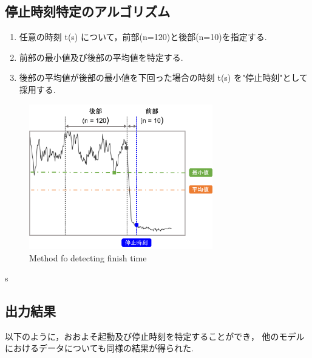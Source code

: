 \documentclass[twocolumn,a4j]{jsarticle}
\begin{document}
\subsection{停止時刻特定のアルゴリズム}
\begin{enumerate}[(1)]
    \item 任意の時刻 t(s) について，前部(n=120)と後部(n=10)を指定する.
    \item 前部の最小値及び後部の平均値を特定する.
    \item 後部の平均値が後部の最小値を下回った場合の時刻 t(s) を"停止時刻"として採用する.
\end{enumerate}
\begin{figure}[htbp]
    \footnotesize
    \begin{center}
        \includegraphics[width=80mm]{images/finish.png}
        \caption{Method fo detecting finish time}
    \end{center}
\end{figure}
s\subsection{出力結果}
以下のように，おおよそ起動及び停止時刻を特定することができ，
他のモデルにおけるデータについても同様の結果が得られた.
\end{document}
